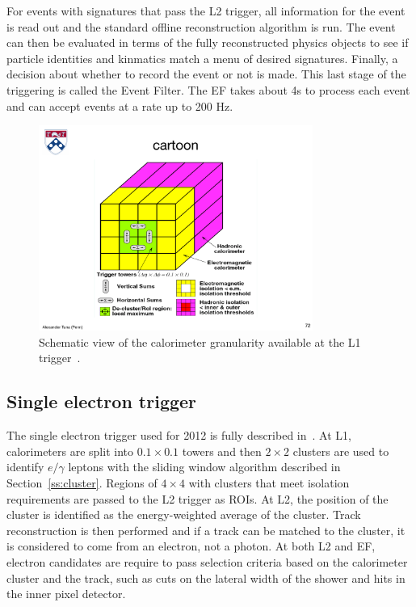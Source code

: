 For events with signatures that pass the L2 trigger, all information for the event is read out and the standard offline reconstruction algorithm is run. The event can then be evaluated in terms of the fully reconstructed physics objects to see if particle identities and kinmatics match a menu of desired signatures. Finally, a decision about whether to record the event or not is made. This last stage of the triggering is called the Event Filter. The EF takes about 4s to process each event and can accept events at a rate up to 200 Hz.


\begin{figure}[tp]
  \centering
  \includegraphics[width=0.80\textwidth]{fig/atlas/cartoonL1.pdf}
  \caption{Schematic view of the calorimeter granularity available at the L1 trigger~\cite{TDR-L1}.}
  \label{fig:l1}
\end{figure}
\subsection{Single electron trigger}
The single electron trigger used for 2012 is fully described in~\cite{eltrig}. At L1, calorimeters are split into $0.1\times0.1$ towers and then $2\times 2$ clusters are used to identify $e/\gamma$ leptons with the sliding window algorithm described in Section~\ref{ss:cluster}. Regions of $4\times 4$ with clusters that meet isolation requirements are passed to the L2 trigger as ROIs. At L2, the position of the cluster is identified as the energy-weighted average of the cluster. Track reconstruction is then performed and if a track can be matched to the cluster, it is considered to come from an electron, not a photon. At both L2 and EF, electron candidates are require to pass selection criteria based on the calorimeter cluster and the track, such as cuts on the lateral width of the shower and hits in the inner pixel detector.

